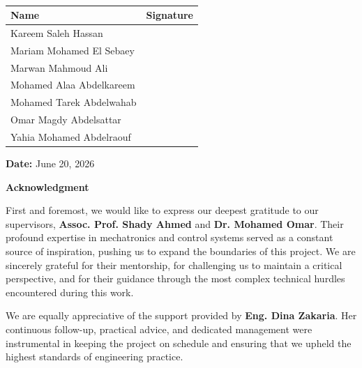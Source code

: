 \documentclass[11pt,a4paper,twoside]{report}
\begin{document}
\begin{table}[H]
\centering
\renewcommand{\arraystretch}{2.5}  %
\begin{tabularx}{\textwidth}{|>{\centering\arraybackslash}X|>{\centering\arraybackslash}X|}  
\hline
\textbf{Name} & \textbf{Signature} \\ \hline
Kareem Saleh Hassan &  \\ \hline
Mariam Mohamed El Sebaey &  \\ \hline
Marwan Mahmoud Ali &  \\ \hline
Mohamed Alaa Abdelkareem &  \\ \hline
Mohamed Tarek Abdelwahab &  \\ \hline
Omar Magdy Abdelsattar &  \\ \hline
Yahia Mohamed Abdelraouf &  \\ \hline
\end{tabularx}
\caption*{} %
\label{tab:signatures}
\end{table}

\textbf{Date:}
June 20, 2026
\clearpage

\vspace*{-2cm} %
\thispagestyle{footeronly}
\begin{center}
    {\Large \textbf{Acknowledgment}} %
\end{center}

\vspace{1cm} %

First and foremost, we would like to express our deepest gratitude to our supervisors, \textbf{Assoc. Prof. Shady Ahmed} and \textbf{Dr. Mohamed Omar}. Their profound expertise in mechatronics and control systems served as a constant source of inspiration, pushing us to expand the boundaries of this project. We are sincerely grateful for their mentorship, for challenging us to maintain a critical perspective, and for their guidance through the most complex technical hurdles encountered during this work.

We are equally appreciative of the support provided by \textbf{Eng. Dina Zakaria}. Her continuous follow-up, practical advice, and dedicated management were instrumental in keeping the project on schedule and ensuring that we upheld the highest standards of engineering practice.
\end{document}
